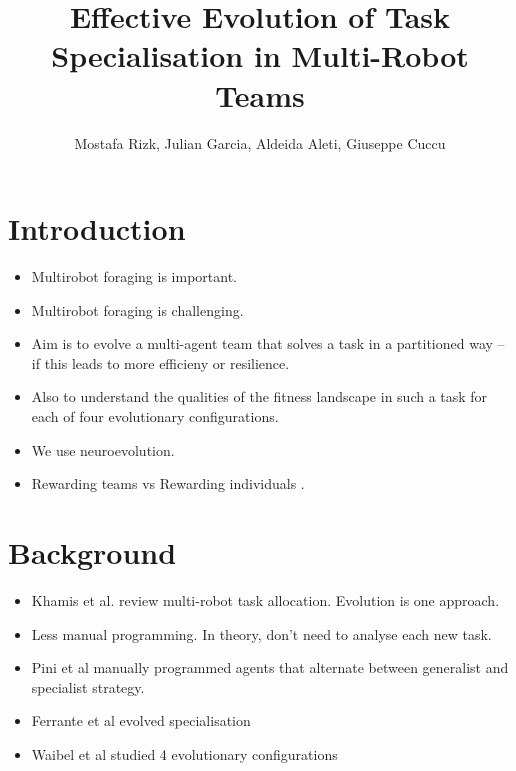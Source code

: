 \documentclass[12pt]{article}  %
\author{Mostafa Rizk, Julian Garcia, Aldeida Aleti, Giuseppe Cuccu}
\begin{document}
\title{Effective Evolution of Task Specialisation in Multi-Robot Teams}  
\maketitle


\section{Introduction}

\begin{itemize}
    \item Multirobot foraging is important.
    \item Multirobot foraging is challenging.
    \item Aim is to evolve a multi-agent team that solves a task in a partitioned way -- if this leads to more efficieny or resilience.
    \item Also to understand the qualities of the fitness landscape in such a task for each of four evolutionary configurations. 
    \item We use neuroevolution.
    \item Rewarding teams vs Rewarding individuals \cite{Lon_Holvoet:2017}. 
\end{itemize}



\section{Background}
\begin{itemize}
    \item Khamis et al. \cite{khamis:2015} review multi-robot task allocation. Evolution is one approach. 
    \item Less manual programming. In theory, don’t need to analyse each new task.
    \item Pini et al manually programmed agents that alternate between generalist and specialist strategy.
    \item Ferrante et al \cite{ferrante:PLOS_CB:2015} evolved specialisation 
    \item Waibel et al studied 4 evolutionary configurations \cite{waibel:Transactions:2009}
\end{itemize}
\end{document}
